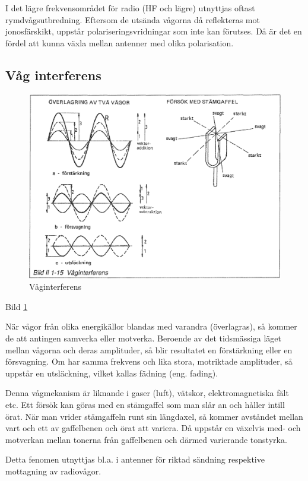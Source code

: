 I det lägre frekvensområdet för radio (HF och lägre) utnyttjas oftast
rymdvågsutbredning. Eftersom de utsända vågorna då reflekteras mot
jonosfärskikt, uppstår polariseringsvridningar som inte kan förutses. Då är det
en fördel att kunna växla mellan antenner med olika polarisation.

\subsection{Våg interferens}

\begin{figure}
  \includegraphics[width=\textwidth]{images/bild_2_1-15}
  \caption{Våginterferens}
  \label{fig:BildII1-15}
\end{figure}

Bild \ref{fig:BildII1-15}

När vågor från olika energikällor blandas med varandra (överlagras), så kommer
de att antingen samverka eller motverka. Beroende av det tidsmässiga läget
mellan vågorna och deras amplituder, så blir resultatet en förstärkning eller
en försvagning. Om har samma frekvens och lika stora, motriktade amplituder, så
uppstår en utsläckning, vilket kallas fädning (eng. fading).

Denna vågmekanism är liknande i gaser (luft), vätskor, elektromagnetiska fält
etc. Ett försök kan göras med en stämgaffel som man slår an och håller intill
örat. När man vrider stämgaffeln runt sin längdaxel, så kommer avståndet mellan
vart och ett av gaffelbenen och örat att variera. Då uppstår en växelvis med-
och motverkan mellan tonerna från gaffelbenen och därmed varierande tonstyrka.

Detta fenomen utnyttjas bl.a. i antenner för riktad sändning respektive
mottagning av radiovågor.
